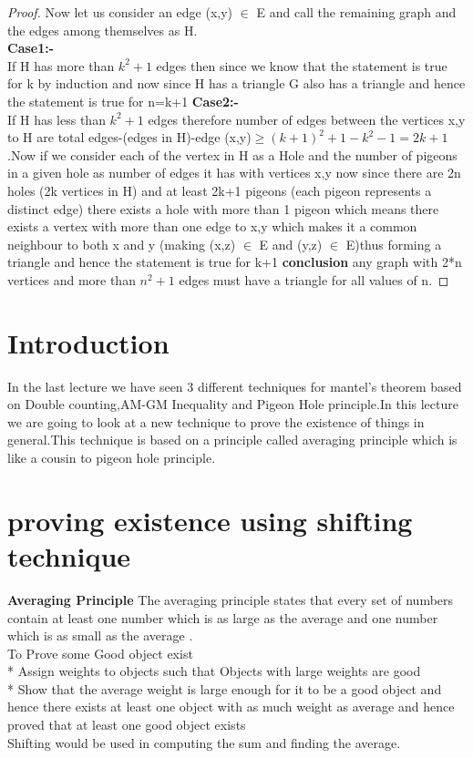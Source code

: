 \begin{proof}
Now let us consider an edge (x,y) $\in$ E and call the remaining graph and the edges among themselves as H.\\
\textbf{Case1:-}\\
If H has more than $k^2+1$ edges then since we know that the statement is true for k by induction and now since H has a triangle G also has a triangle and hence the statement is true for n=k+1
\textbf{Case2:-}\\
If H has less than $k^2+1 $ edges therefore number of edges between the vertices x,y to H are 
total edges-(edges in H)-edge (x,y)$\geq (k+1)^2+1-k^2-1=2k+1$.Now if we consider each of the vertex in H as a Hole and the number of pigeons in a given hole as number of edges it has with vertices x,y  now since there are 2n holes (2k vertices in H) and at least 2k+1 pigeons (each pigeon represents a distinct edge) there exists a hole with more than 1 pigeon which means there exists a vertex with more than one edge to x,y which makes it a common neighbour to both x and y  (making (x,z) $\in$ E and (y,z) $\in$ E)thus forming a triangle and hence the statement is true for k+1
\textbf{conclusion} any graph with 2*n vertices and more than $n^2+1$ edges must have a triangle for all values of n.
\end{proof}




\section{Introduction}
In the last lecture we have seen 3 different techniques for mantel's theorem based on Double counting,AM-GM Inequality and Pigeon Hole principle.In this lecture we are going to look at a new technique to prove the existence of things in general.This technique is based on a principle called averaging principle which is like a cousin to pigeon hole principle.\\

\section{ proving existence using shifting technique}
\textbf{Averaging Principle}
The averaging principle states that every set of numbers contain at least one number which is as large as the average and one number which is as small as the average .\\
To Prove some Good object exist\\
* Assign weights to objects such that Objects with large weights are good\\
* Show that the average weight is large enough for it to be a good object 
and hence there exists at least one object with as much weight as average and hence proved that at least one good object exists\\
Shifting would be used in computing the sum and finding the average.

